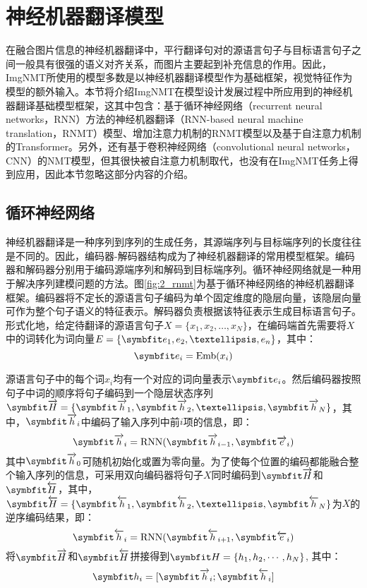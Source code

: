 \section{神经机器翻译模型}
\label{sec:2_nmt}
在融合图片信息的神经机器翻译中，平行翻译句对的源语言句子与目标语言句子之间一般具有很强的语义对齐关系，而图片主要起到补充信息的作用。因此，ImgNMT所使用的模型多数是以神经机器翻译模型作为基础框架，视觉特征作为模型的额外输入。本节将介绍ImgNMT在模型设计发展过程中所应用到的神经机器翻译基础模型框架，这其中包含：基于循环神经网络（recurrent neural networks，RNN）方法的神经机器翻译（RNN-based neural machine translation，RNMT）模型、增加注意力机制的RNMT模型以及基于自注意力机制的Transformer。另外，还有基于卷积神经网络（convolutional neural networks，CNN）的NMT模型，但其很快被自注意力机制取代，也没有在ImgNMT任务上得到应用，因此本节忽略这部分内容的介绍。

\subsection{循环神经网络}
\label{sec:2_rnn}

神经机器翻译是一种序列到序列的生成任务，其源端序列与目标端序列的长度往往是不同的。因此，编码器-解码器结构成为了神经机器翻译的常用模型框架。编码器和解码器分别用于编码源端序列和解码到目标端序列。循环神经网络就是一种用于解决序列建模问题的方法。图\ref{fig:2_rnmt}为基于循环神经网络的神经机器翻译框架。编码器将不定长的源语言句子编码为单个固定维度的隐层向量，该隐层向量可作为整个句子语义的特征表示。解码器负责根据该特征表示生成目标语言句子。形式化地，给定待翻译的源语言句子$X=\{x_1,x_2,…,x_N\}$，在编码端首先需要将$X$中的词转化为词向量$E=\{\Vector{e_1,e_2,…,e_n}\}$，其中：
\begin{equation}
    \Vector{e_i}=\mathrm{Emb}(x_i)
\end{equation}

源语言句子中的每个词$x_i$均有一个对应的词向量表示$\Vector{e_i}$。然后编码器按照句子中词的顺序将句子编码到一个隐层状态序列$\rarwvec{H}=\{\rarwvec{h}_1,\rarwvec{h}_2,…,\rarwvec{h}_N\}$，其中，$\rarwvec{h}_i$中编码了输入序列中前$i$项的信息，即：
\begin{equation}
    \rarwvec{h}_i=\mathrm{RNN}(\rarwvec{h}_{i-1},\rarwvec{e}_i)
\end{equation}
其中$\rarwvec{h}_{0}$可随机初始化或置为零向量。为了使每个位置的编码都能融合整个输入序列的信息，可采用双向编码器将句子$X$同时编码到$\rarwvec{H}$和$\larwvec{H}$，其中，$\larwvec{H}=\{\larwvec{h}_1,\larwvec{h}_2,…,\larwvec{h}_N\}$为$X$的逆序编码结果，即：
\begin{equation}
    \larwvec{h}_i=\mathrm{RNN}(\larwvec{h}_{i+1},\larwvec{e}_i)
\end{equation}
将$\rarwvec{H}$和$\larwvec{H}$拼接得到$\Vector{H=\{h_1,h_2,\cdots,h_N}\}$, 其中：
\begin{equation}
    \Vector{h_i}=[\rarwvec{h}_i;\larwvec{h}_i]
\end{equation}

